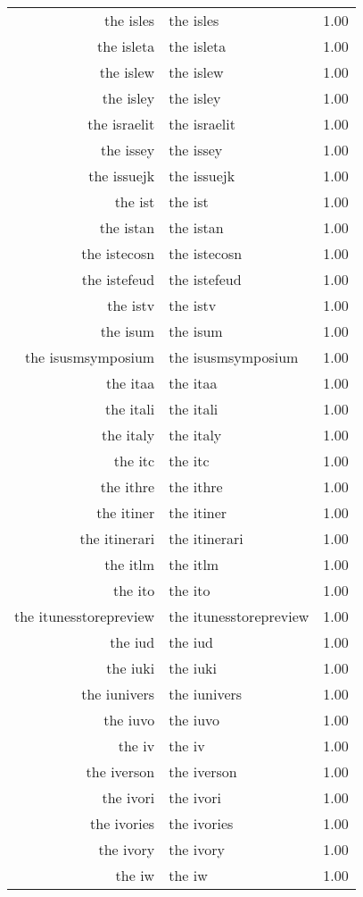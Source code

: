 \begin{table}[ht]
\begin{tabular}{rlr}
  the isles & the isles & 1.00 \\ 
  the isleta & the isleta & 1.00 \\ 
  the islew & the islew & 1.00 \\ 
  the isley & the isley & 1.00 \\ 
  the israelit & the israelit & 1.00 \\ 
  the issey & the issey & 1.00 \\ 
  the issuejk & the issuejk & 1.00 \\ 
  the ist & the ist & 1.00 \\ 
  the istan & the istan & 1.00 \\ 
  the istecosn & the istecosn & 1.00 \\ 
  the istefeud & the istefeud & 1.00 \\ 
  the istv & the istv & 1.00 \\ 
  the isum & the isum & 1.00 \\ 
  the isusmsymposium & the isusmsymposium & 1.00 \\ 
  the itaa & the itaa & 1.00 \\ 
  the itali & the itali & 1.00 \\ 
  the italy & the italy & 1.00 \\ 
  the itc & the itc & 1.00 \\ 
  the ithre & the ithre & 1.00 \\ 
  the itiner & the itiner & 1.00 \\ 
  the itinerari & the itinerari & 1.00 \\ 
  the itlm & the itlm & 1.00 \\ 
  the ito & the ito & 1.00 \\ 
  the itunesstorepreview & the itunesstorepreview & 1.00 \\ 
  the iud & the iud & 1.00 \\ 
  the iuki & the iuki & 1.00 \\ 
  the iunivers & the iunivers & 1.00 \\ 
  the iuvo & the iuvo & 1.00 \\ 
  the iv & the iv & 1.00 \\ 
  the iverson & the iverson & 1.00 \\ 
  the ivori & the ivori & 1.00 \\ 
  the ivories & the ivories & 1.00 \\ 
  the ivory & the ivory & 1.00 \\ 
  the iw & the iw & 1.00 \\ 

\end{tabular}
\end{table}
